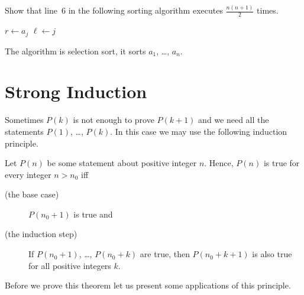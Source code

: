 \begin{exercise}
\label{exercise:selection-sort}
    Show that line~6 in the following sorting algorithm executes
    $\frac{n (n + 1)}{2}$ times.
    \begin{algorithm}
        \begin{algorithmic}[1]
                            \State $r \gets a_j$
                            \State $\ell \gets j$
                        \EndIf
                    \EndFor
                \EndFor
            \EndFunction
    \end{algorithmic}
    \caption{The algorithm is selection sort, it sorts $a_1$, \dots, $a_n$.}
  \end{algorithm}
\end{exercise}



\section{Strong Induction}

Sometimes $P(k)$ is not enough to prove $P(k + 1)$ and we need all the
statements $P(1)$, \dots, $P(k)$. In this case we may use the following
induction  principle.

\begin{theorem}
\label{theorem:strong-induction}
    Let $P(n)$ be some statement about positive integer $n$.
    Hence, $P(n)$ is true for every integer $n > n_0$ iff
    \begin{description}
        \item [(the base case)] $P(n_0 + 1)$ is true and
        \item [(the induction step)] If $P(n_0 + 1)$, \dots, $P(n_0 + k)$ are true,
            then $P(n_0 + k + 1)$ is also true for all positive integers $k$.
  \end{description}
\end{theorem}

Before we prove this theorem let us present some applications of this
principle.

